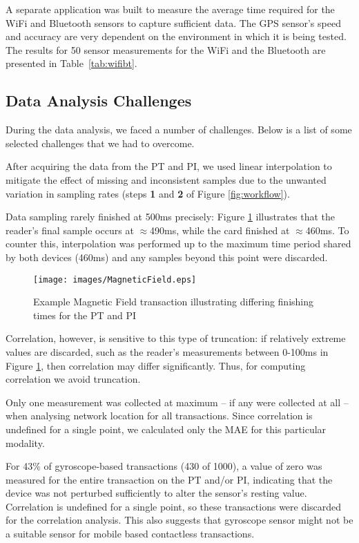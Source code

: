 \documentclass{article}
\begin{document}
        A separate application was built to measure the average time required for the WiFi and Bluetooth sensors to capture sufficient data.
		The GPS sensor's speed and accuracy are very dependent on the environment in which it is being tested.
		The results for 50 sensor measurements for the WiFi and the Bluetooth are presented in Table~\ref{tab:wifibt}.




\subsection{Data Analysis Challenges}
\label{sec:Data_Analaysis_Challenge}

During the data analysis, we faced a number of challenges.  Below is a list of some selected challenges that we had to overcome. 


After acquiring the data from the PT and PI, we used linear interpolation to mitigate the effect of missing and inconsistent samples due to the unwanted variation in sampling rates (steps \textbf{1} and \textbf{2} of Figure \ref{fig:workflow}).



Data sampling rarely finished at 500ms precisely: Figure \ref{fig:magfield} illustrates that the reader's final sample occurs at $\approx$490ms, while the card finished at $\approx$460ms.  To counter this, interpolation was performed up to the maximum time period shared by both devices (460ms) and any samples beyond this point were discarded.  

\begin{figure}[h]
\centering
\texttt{[image: images/MagneticField.eps]}
\caption{Example Magnetic Field transaction illustrating differing finishing times for the PT and PI}
\label{fig:magfield}
\end{figure}

 Correlation, however, is sensitive to this type of truncation: if relatively extreme values are discarded, such as the reader's measurements between 0-100ms in Figure \ref{fig:magfield}, then correlation may differ significantly. Thus, for computing correlation we avoid truncation.  

 Only one measurement was collected at maximum -- if any were collected at all -- when analysing network location for all transactions.  Since correlation is undefined for a single point, we calculated only the MAE for this particular modality.

For 43\% of gyroscope-based transactions (430 of 1000), a value of zero was measured for the entire transaction on the PT and/or PI, indicating that the device was not perturbed sufficiently to alter the sensor's resting value.  Correlation is undefined for a single point, so these transactions were discarded for the correlation analysis. This also suggests that gyroscope sensor might not be a suitable sensor for mobile based contactless transactions.  
\end{document}
